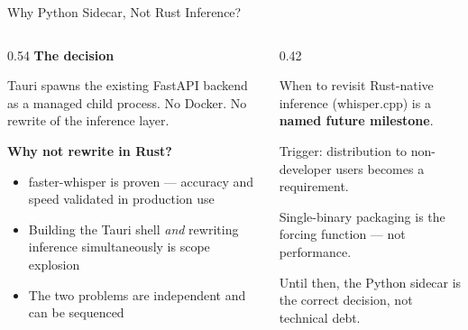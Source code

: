 \documentclass{beamer}
\begin{document}
\begin{frame}{Why Python Sidecar, Not Rust Inference?}
    \small
    \begin{columns}[T]
        \begin{column}{0.54\textwidth}
            \textbf{The decision}

            Tauri spawns the existing FastAPI backend as a managed child process.
            No Docker. No rewrite of the inference layer.

            \vspace{0.4em}
            \textbf{Why not rewrite in Rust?}
            \begin{itemize}\setlength{\itemsep}{1pt}
                \item faster-whisper is proven --- accuracy and
                      speed validated in production use
                \item Building the Tauri shell \textit{and}
                      rewriting inference simultaneously is
                      scope explosion
                \item The two problems are independent and
                      can be sequenced
            \end{itemize}
        \end{column}
        \begin{column}{0.42\textwidth}
            \begin{block}{When to revisit}
                \footnotesize
                Rust-native inference (whisper.cpp) is a
                \textbf{named future milestone}.

                Trigger: distribution to non-developer
                users becomes a requirement.

                Single-binary packaging is the forcing
                function --- not performance.

                Until then, the Python sidecar is
                the correct decision, not technical debt.
            \end{block}
        \end{column}
    \end{columns}
\end{frame}
\end{document}
